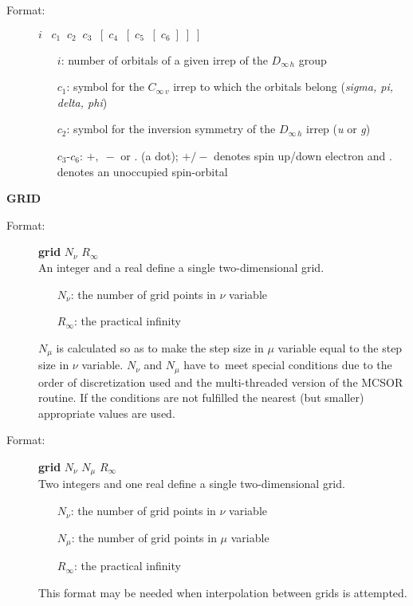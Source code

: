 \documentclass[10pt,a4paper]{article}
\begin{document}
\begin{description}
\begin{description}
\item[Format:] $i\;\;\;c_1\;\;c_2\;\;c_3\;\;[\;c_4\;\;[\;c_5\;\;[\;c_6\;]\;]\;]$
\begin{itemize}
\item[$i$:]  number of orbitals of a given irrep of the
$D_{\infty\,h}$ group
\item[$c_1$:] symbol for the $C_{\infty\,v}$ irrep to which the
orbitals belong ({\it sigma, pi, delta, phi})
\item[$c_2$:] symbol for the inversion symmetry of the $D_{\infty\,h}$
irrep ({\it u} or {\it g})
\item[$c_3$-$c_6$:] $+,\;-$ or . (a dot); $+/-$ denotes spin up/down
electron and . denotes an unoccupied spin-orbital
\end{itemize}
\end{description}

\item \textbf{GRID}

\begin{description}
\item[Format:] \textbf{grid} $N_{\nu}$ $R_{\infty}$ \\
An integer and a real define a single two-dimensional grid.
\begin{itemize}
\item[$N_{\nu}$:] the number of grid points in $\nu$ variable
\item[$R_{\infty}$:] the practical infinity
\end{itemize}
$N_{\mu}$ is calculated so as to make the step size in $\mu$ variable equal
to the step size in $\nu$ variable. $N_{\nu}$ and $N_{\mu}$ have to~meet
special conditions due to the order of discretization used and
the multi-threaded version of the MCSOR routine. If the conditions are not
fulfilled the nearest (but smaller) appropriate values are used.
\end{description}

\begin{description}
\item[Format:] \textbf{grid} $N_{\nu}$ $N_{\mu}$ $R_{\infty}$ \\
Two integers and one real define a single two-dimensional grid.
\begin{itemize}
\item[$N_{\nu}$:] the number of grid points in $\nu$ variable
\item[$N_{\mu}$:] the number of grid points in $\mu$ variable
\item[$R_{\infty}$:] the practical infinity
\end{itemize}
This format may be needed when interpolation between grids is attempted.
\end{description}


\end{description}
\end{document}
